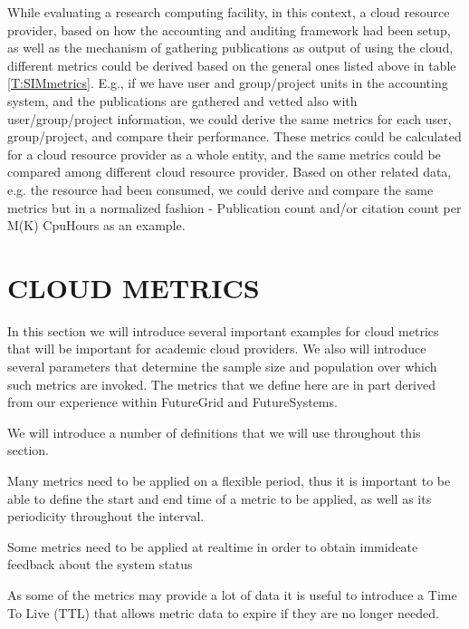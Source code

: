 \documentclass{sig-alternate-05-2015}
\begin{document}
While evaluating a research computing facility, in this context, a cloud resource provider, based on how the accounting and auditing framework had been setup, as well as the mechanism of gathering publications as output of using the cloud, different metrics could be derived based on the general ones listed above in table \ref{T:SIMmetrics}.  E.g., if we have user and group/project units in the accounting system, and the publications are gathered and vetted also with user/group/project information, we could derive the same metrics for each user, group/project, and compare their performance.  These metrics could be calculated for a cloud resource provider as a whole entity, and the same metrics could be compared among different cloud resource provider. Based on other related data, e.g. the resource had been consumed, we could derive and compare the same metrics but in a normalized fashion - Publication count and/or citation count per M(K) CpuHours as an example.


\section{CLOUD METRICS} \label{S:metrics}

In this section we will introduce several important examples for cloud metrics that will be important for academic cloud providers. We also will introduce several parameters that determine the sample size and population over which such metrics are invoked. The metrics that we define here are in part derived from our experience within FutureGrid and FutureSystems.

We will introduce a number of definitions that we will use throughout this section.

\begin{description}
\setlength\itemsep{-2pt}

\item [Period.] Many metrics need to be applied on a flexible period, thus it is important to be able to define the start and end time of a metric to be applied, as well as its periodicity throughout the interval.

\item[Realtime.] Some metrics need to be applied at realtime in order to obtain immideate feedback about the system status

\item[Time to Live.] As some of the metrics may provide a lot of data it is useful to introduce a Time To Live (TTL) that allows metric data to expire if they are no longer needed.
 
\end{description}
\end{document}
